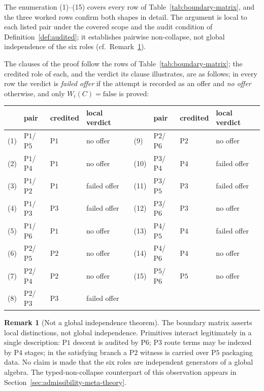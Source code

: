 \documentclass[11pt]{article}
\theoremstyle{definition}
\newtheorem{remark}[theorem]{Remark}
\newcommand{\Pone}{\ensuremath{\mathrm{P1}}}
\newcommand{\Ptwo}{\ensuremath{\mathrm{P2}}}
\newcommand{\Pthree}{\ensuremath{\mathrm{P3}}}
\newcommand{\Pfour}{\ensuremath{\mathrm{P4}}}
\newcommand{\Pfive}{\ensuremath{\mathrm{P5}}}
\newcommand{\Psix}{\ensuremath{\mathrm{P6}}}
\begin{document}
The enumeration (1)--(15) covers every row of
Table~\ref{tab:boundary-matrix}, and the three worked rows confirm both shapes
in detail. The argument is local to each listed pair under the covered scope and
the audit condition of Definition~\ref{def:audited}; it establishes pairwise
non-collapse, not global independence of the six roles (cf.\
Remark~\ref{rem:not-global-independence}).

The clauses of the proof follow the rows of Table~\ref{tab:boundary-matrix};
the credited role of each, and the verdict its clause illustrates, are as follows; in every row the verdict is \emph{failed offer} if the attempt is recorded as an offer and \emph{no offer} otherwise, and only \(W_i(C)=\mathrm{false}\) is proved:
\begin{center}
\footnotesize
\begin{tabular}{@{}llll@{\qquad}llll@{}}
\toprule
& pair & credited & local verdict & & pair & credited & local verdict \\
\midrule
(1) & \Pone{}/\Pfive{} & \Pone{} & no offer & (9) & \Ptwo{}/\Psix{} & \Ptwo{} & no offer \\
(2) & \Pone{}/\Pfour{} & \Pone{} & no offer & (10) & \Pthree{}/\Pfour{} & \Pfour{} & failed offer \\
(3) & \Pone{}/\Ptwo{} & \Pone{} & failed offer & (11) & \Pthree{}/\Pfive{} & \Pthree{} & failed offer \\
(4) & \Pone{}/\Pthree{} & \Pthree{} & failed offer & (12) & \Pthree{}/\Psix{} & \Pthree{} & no offer \\
(5) & \Pone{}/\Psix{} & \Pone{} & no offer & (13) & \Pfour{}/\Pfive{} & \Pfour{} & failed offer \\
(6) & \Ptwo{}/\Pfive{} & \Ptwo{} & no offer & (14) & \Pfour{}/\Psix{} & \Pfour{} & no offer \\
(7) & \Ptwo{}/\Pfour{} & \Ptwo{} & no offer & (15) & \Pfive{}/\Psix{} & \Pfive{} & no offer \\
(8) & \Ptwo{}/\Pthree{} & \Pthree{} & failed offer & & & & \\
\bottomrule
\end{tabular}
\end{center}

\begin{remark}[Not a global independence theorem]\label{rem:not-global-independence}
The boundary matrix asserts local distinctions, not global
independence. Primitives interact legitimately in a single
description: \Pone{} descent is audited by \Psix{}; \Pthree{} route
terms may be indexed by \Pfour{} stages; in the satisfying branch a
\Ptwo{} witness is carried over \Pfive{} packaging data.
No claim is made that the six roles are independent generators of a
global algebra. The typed-non-collapse counterpart of this observation
appears in Section~\ref{sec:admissibility-meta-theory}.
\end{remark}
\end{document}
